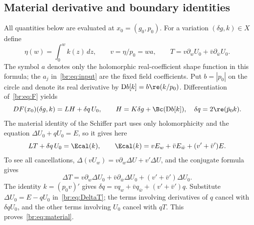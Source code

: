 \subsection{Material derivative and boundary identities}\label{br:sec:linearization}
All quantities below are evaluated at $x_0=(g_0,p_0)$. For a variation
$(\delta g,k)\in X$ define
\begin{equation}\label{br:eq:variation}
 \eta(w)=\int_0^wk(z)\,dz,\qquad
 v=\eta/p_0=wa,\qquad
 T=v\partial_wU_0+\bar v\partial_{\bar w}U_0.
\end{equation}
The symbol $a$ denotes only the holomorphic real-coefficient shape
function in this formula; the $a_j$ in~\eqref{br:eq:input} are the fixed
field coefficients. Put $b=|p_0|$ on the circle and denote its real
derivative by $\mathrm Db[k]=b\re(k/p_0)$.
Differentiation of~\eqref{br:eq:F} yields
\begin{equation}\label{br:eq:DF}
 DF(x_0)(\delta g,k)=LH+\delta q\,U_0,
 \qquad H=K\delta g+\Bc(\mathrm Db[k]),\quad
 \delta q=2\re(\bar p_0k).
\end{equation}
The material identity of the Schiffer part uses only holomorphicity
and the equation $\Delta U_0+qU_0=E$, so it gives here
\begin{equation}\label{br:eq:material}
 LT+\delta q\,U_0=\Ecal(k),\qquad
 \Ecal(k)=vE_w+\bar vE_{\bar w}+(v'+\bar v')E.
\end{equation}
To see all cancellations, $\Delta(vU_w)=v\partial_w\Delta U+v'\Delta U$,
and the conjugate formula gives
\begin{equation}\label{br:eq:DeltaT}
 \Delta T=v\partial_w\Delta U_0+\bar v\partial_{\bar w}\Delta U_0
                  +(v'+\bar v')\Delta U_0.
\end{equation}
The identity $k=(p_0v)'$ gives
$\delta q=vq_w+\bar vq_{\bar w}+(v'+\bar v')q$.
Substitute $\Delta U_0=E-qU_0$ in~\eqref{br:eq:DeltaT}; the terms involving
derivatives of $q$ cancel with $\delta qU_0$, and the other terms involving
$U_0$ cancel with $qT$. This proves~\eqref{br:eq:material}.

